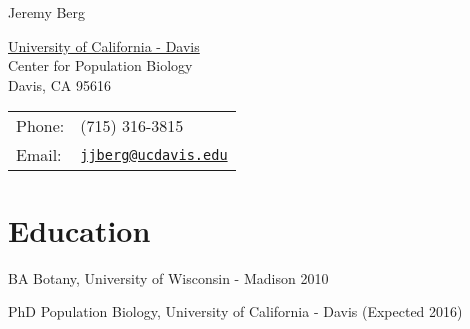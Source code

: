 \documentclass[letterpaper]{article}
\def\name{Jeremy Berg}
\renewenvironment{itemize}{
  \begin{list}{}{
    \setlength{\leftmargin}{1.5em}
  }
}{
  \end{list}
}
\begin{document}
{\huge \name}


\vspace{0.25in}

\begin{minipage}{0.45\linewidth}
  \href{http://www.ucdavis.edu/}{University of California - Davis} \\
  Center for Population Biology \\
  Davis, CA 95616
\end{minipage}
\begin{minipage}{0.45\linewidth}
  \begin{tabular}{ll}
    Phone: & (715) 316-3815 \\
    Email: & \href{jjberg@ucdavis.edu}{\tt jjberg@ucdavis.edu} \\
  \end{tabular}
\end{minipage}

\section*{Education}
\begin{itemize}
 \item BA Botany, University of Wisconsin - Madison 2010
 \item PhD Population Biology, University of California - Davis (Expected 2016)
 \end{itemize}

%
%
\end{document}

